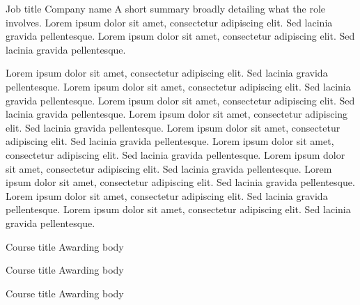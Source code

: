 \documentclass[a4paper]{ReadableCV}
\begin{document}
{Job title}
{Company name}
{A short summary broadly detailing what the role involves. Lorem ipsum dolor sit amet, consectetur adipiscing elit. Sed lacinia gravida pellentesque. Lorem ipsum dolor sit amet, consectetur adipiscing elit. Sed lacinia gravida pellentesque.}

{Lorem ipsum dolor sit amet, consectetur adipiscing elit. Sed lacinia gravida pellentesque. Lorem ipsum dolor sit amet, consectetur adipiscing elit. Sed lacinia gravida pellentesque.}
{Lorem ipsum dolor sit amet, consectetur adipiscing elit. Sed lacinia gravida pellentesque. Lorem ipsum dolor sit amet, consectetur adipiscing elit. Sed lacinia gravida pellentesque.}
{Lorem ipsum dolor sit amet, consectetur adipiscing elit. Sed lacinia gravida pellentesque. Lorem ipsum dolor sit amet, consectetur adipiscing elit. Sed lacinia gravida pellentesque.}
{Lorem ipsum dolor sit amet, consectetur adipiscing elit. Sed lacinia gravida pellentesque. Lorem ipsum dolor sit amet, consectetur adipiscing elit. Sed lacinia gravida pellentesque.}
{Lorem ipsum dolor sit amet, consectetur adipiscing elit. Sed lacinia gravida pellentesque. Lorem ipsum dolor sit amet, consectetur adipiscing elit. Sed lacinia gravida pellentesque.}


\newpage


{Course title}
{Awarding body}{}

{Course title}
{Awarding body}{}

{Course title}
{Awarding body}{}
\end{document}
